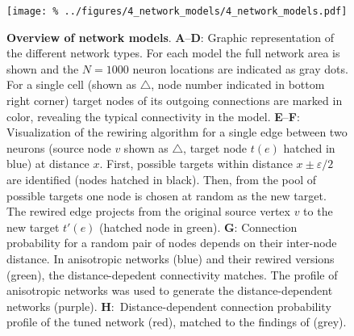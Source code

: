 
\begin{figure}[h]
    \vspace{0.25cm}
    \texttt{[image: \%
      ../figures/4\_network\_models/4\_network\_models.pdf]} %
  \vspace{-0.1cm}
  \caption{{\bf Overview of network models}. \textbf{A}--\textbf{D}:
    Graphic representation of the different network types. For each
    model the full network area is shown and the $N=1000$ neuron
    locations are indicated as gray dots. For a single cell (shown as
    $\bigtriangleup$, node number indicated in bottom right corner)
    target nodes of its outgoing connections are marked in color,
    revealing the typical connectivity in the model. %
    \textbf{E}--\textbf{F}: Visualization of the rewiring algorithm
    for a single edge between two neurons (source node $v$ shown as
    $\bigtriangleup$, target node $t(e)$ hatched in blue) at distance
    $x$. First, possible targets within distance $x \pm \varepsilon/2$
    are identified (nodes hatched in black). Then, from the pool of
    possible targets one node is chosen at random as the new
    target. The rewired edge projects from the original source vertex
    $v$ to the new target $t'(e)$ (hatched node in green). \textbf{G}:
    Connection probability for a random pair of nodes depends on their
    inter-node distance. In anisotropic networks (blue) and their
    rewired versions (green), the distance-depedent connectivity
    matches. The profile of anisotropic networks was used to generate
    the distance-dependent networks
    (purple). \textbf{H}:~Distance-dependent connection probability
    profile of the tuned network (red), matched to the findings of
    \textcite{Perin2011} (grey).}
\label{fig:4_net_models}
\end{figure}
